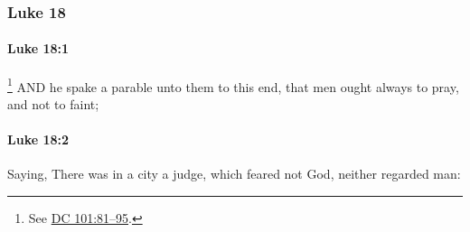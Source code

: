 	\subsubsection{Luke 18} %
		\label{LUKE-18}
		
		\paragraph{Luke 18:1} %
			\label{LUKE-18-1}

				\footnote{%
					See \hyperref[DC101-81]{DC 101:81--95}.
					}%
			AND he spake a parable unto them to this end, that men ought always to pray, and not to faint;

			\begin{framed}
			\scriptsize
				\begin{compactdesc}
					\item[SBLG] 
				\end{compactdesc}
			\end{framed}

		\paragraph{Luke 18:2} %
			\label{LUKE-18-2}

			Saying, There was in a city a judge, which feared not God, neither regarded man:


